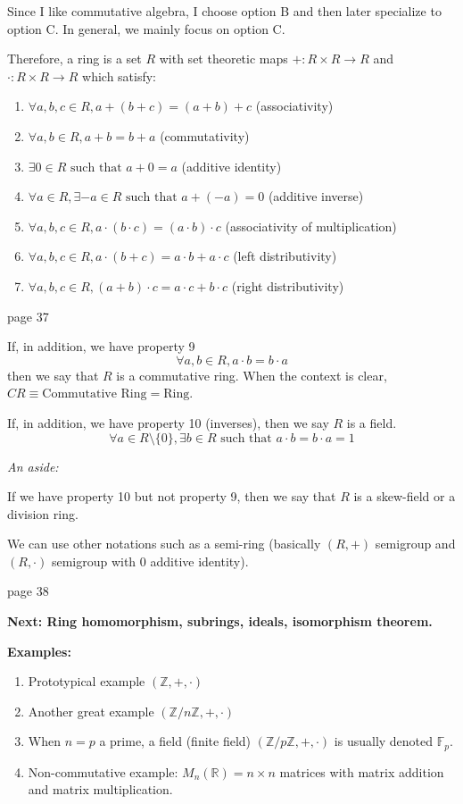 \documentclass{article}
\begin{document}
Since I like commutative algebra, I choose option B and then later specialize to option C. In general, we mainly focus on option C.

Therefore, a ring is a set $R$ with set theoretic maps $+: R \times R \to R$ and $\cdot: R \times R \to R$ which satisfy:
\begin{enumerate}
    \item $\forall a, b, c \in R, a + (b + c) = (a + b) + c$ \quad (associativity)
    \item $\forall a, b \in R, a + b = b + a$ \quad (commutativity)
    \item $\exists 0 \in R \text{ such that } a + 0 = a$ \quad (additive identity)
    \item $\forall a \in R, \exists -a \in R \text{ such that } a + (-a) = 0$ \quad (additive inverse)
    \item $\forall a, b, c \in R, a \cdot (b \cdot c) = (a \cdot b) \cdot c$ \quad (associativity of multiplication)
    \item $\forall a, b, c \in R, a \cdot (b + c) = a \cdot b + a \cdot c$ \quad (left distributivity)
    \item $\forall a, b, c \in R, (a + b) \cdot c = a \cdot c + b \cdot c$ \quad (right distributivity)
\end{enumerate}

\newpage
\noindent page 37

If, in addition, we have property 9
\[
\forall a, b \in R, a \cdot b = b \cdot a
\]
then we say that $R$ is a commutative ring. When the context is clear, $CR \equiv \text{Commutative Ring} = \text{Ring}$.

If, in addition, we have property 10 (inverses), then we say $R$ is a field.
\[
\forall a \in R \setminus \{ 0 \}, \exists b \in R \text{ such that } a \cdot b = b \cdot a = 1
\]

\textit{An aside:}

If we have property 10 but not property 9, then we say that $R$ is a skew-field or a division ring.

We can use other notations such as a semi-ring (basically $(R, +)$ semigroup and $(R, \cdot)$ semigroup with 0 additive identity).

\newpage
\noindent page 38

\textbf{Next: Ring homomorphism, subrings, ideals, isomorphism theorem.}

\textbf{Examples:}
\begin{enumerate}
    \item Prototypical example $(\mathbb{Z}, +, \cdot)$
    \item Another great example $(\mathbb{Z}/n\mathbb{Z}, +, \cdot)$
    \item When $n = p$ a prime, a field (finite field) $(\mathbb{Z}/p\mathbb{Z}, +, \cdot)$ is usually denoted $\mathbb{F}_p$.
    \item Non-commutative example: $M_n(\mathbb{R}) = n \times n$ matrices with matrix addition and matrix multiplication.
\end{enumerate}
\end{document}
